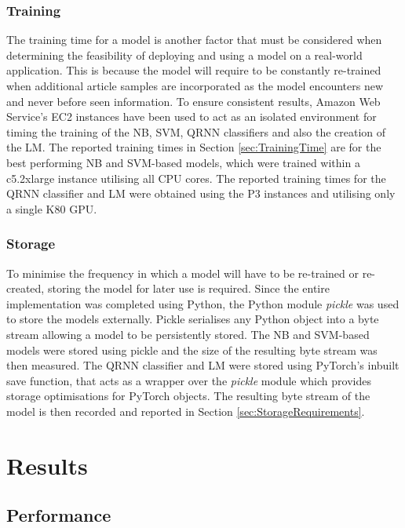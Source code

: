 \documentclass[a4paper,twoside,phd]{BYUPhys}
\begin{document}
\subsection{Training}
\label{sec:TrainingExperiments}
The training time for a model is another factor that must be considered when determining the feasibility of deploying and using a model on a real-world application. This is because the model will require to be constantly re-trained when additional article samples are incorporated as the model encounters new and never before seen information. To ensure consistent results, Amazon Web Service's EC2 instances \cite{AWS} have been used to act as an isolated environment for timing the training of the NB, SVM, QRNN classifiers and also  the creation of the LM. The reported training times in Section \ref{sec:TrainingTime} are for the best performing NB and SVM-based models, which were trained within a c5.2xlarge instance utilising all CPU cores. The reported training times for the QRNN classifier and LM were obtained using the P3 instances and utilising only a single K80 GPU.


\subsection{Storage}
\label{sec:StorageExperiments}
To minimise the frequency in which a model will have to be re-trained or re-created, storing the model for later use is required. Since the entire implementation was completed using Python, the Python module \textit{pickle} was used to store the models externally. Pickle serialises any Python object into a byte stream allowing a model to be persistently stored. The NB and SVM-based models were stored using pickle and the size of the resulting byte stream was then measured. The QRNN classifier and LM were stored using PyTorch's inbuilt save function, that acts as a wrapper over the \textit{pickle} module which provides storage optimisations for PyTorch objects. The resulting byte stream of the model is then recorded and reported in Section \ref{sec:StorageRequirements}.



\chapter{Results}
\label{chap:Results}

\section{Performance}
\label{sec:AccuracyResults}
\end{document}
